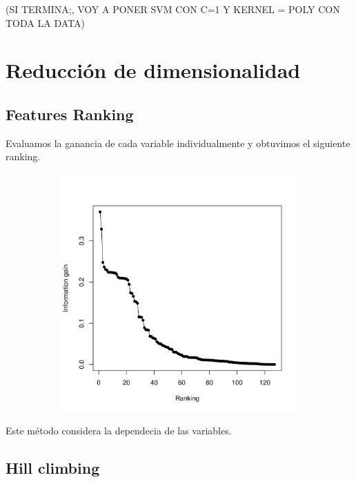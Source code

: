 \documentclass[a4paper,10pt]{article}
\begin{document}
(SI TERMINA;, VOY A PONER SVM CON C=1 Y KERNEL = POLY CON TODA LA DATA)

\section{Reducci\'on de dimensionalidad}

\subsection{Features Ranking}

Evaluamos la ganancia de cada variable individualmente y obtuvimos el siguiente ranking. 

  \begin{figure}[H]
    \centering
    \begin{subfigure}[b]{0.4\textwidth}
      \includegraphics[width=\textwidth]{../imagenes/features_ranking}
      \caption{}
    \end{subfigure}
    \label{fig:features_ranking}
  \end{figure}

Este m\'etodo considera la dependecia de las variables. 

\subsection{Hill climbing}
\end{document}
